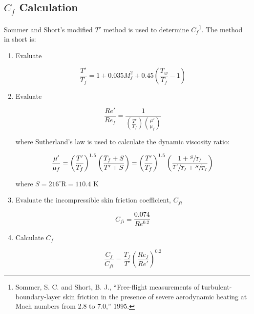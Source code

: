 \documentclass{article}
\begin{document}
\subsection{$C_f$ Calculation}

Sommer and Short's modified $T'$ method is used to determine $C_f$\footnote{Sommer, S. C. and Short, B. J., ``Free-flight measurements of turbulent-boundary-layer skin friction in the presence of severe aerodynamic heating at Mach numbers from 2.8 to 7.0,'' 1995.}. The method in short is:

\begin{enumerate}
\item Evaluate

\begin{equation}
\frac{T'}{T_f} = 1 + 0.035 M_f^2 + 0.45 \left( \frac{T_w}{T_f} - 1 \right)
\end{equation}

\item Evaluate

\begin{equation}
\frac{Re'}{Re_f} = \frac{1}{\left(\frac{T'}{T_f}\right) \left(\frac{\mu'}{\mu_f}\right)}
\end{equation}

where Sutherland's law is used to calculate the dynamic viscosity ratio:

\begin{equation}
\frac{\mu'}{\mu_f} = \left(\frac{T'}{T_f}\right)^{1.5} \left( \frac{T_f + S}{T' + S} \right) = \left(\frac{T'}{T_f}\right)^{1.5} \left( \frac{1 + \sfrac{S}{T_f}}{\sfrac{T'}{T_f} + \sfrac{S}{T_f}} \right)
\end{equation}

where $S = 216 ^{\circ} \textrm{R} = 110.4 \textrm{ K}$

\item Evaluate the incompressible skin friction coefficient, $C_{fi}$

\begin{equation}
C_{fi} = \frac{0.074}{Re^{0.2}}
\end{equation}

\item Calculate $C_f$

\begin{equation}
\frac{C_f}{C_{fi}} = \frac{T_f}{T'} \left( \frac{Re_f}{Re'} \right)^{0.2}
\end{equation}

\end{enumerate}
\end{document}
